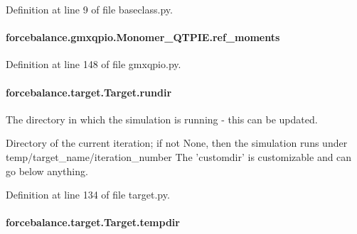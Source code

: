 Definition at line 9 of file baseclass.\-py.

\hypertarget{classforcebalance_1_1gmxqpio_1_1Monomer__QTPIE_a17de0cabe736ba52ae17f8476db7d35a}{
\paragraph[{ref\-\_\-moments}]{\setlength{\rightskip}{0pt plus 5cm}forcebalance.\-gmxqpio.\-Monomer\-\_\-\-Q\-T\-P\-I\-E.\-ref\-\_\-moments}}\label{classforcebalance_1_1gmxqpio_1_1Monomer__QTPIE_a17de0cabe736ba52ae17f8476db7d35a}


Definition at line 148 of file gmxqpio.\-py.

\hypertarget{classforcebalance_1_1target_1_1Target_a6872de5b2d4273b82336ea5b0da29c9e}{
\paragraph[{rundir}]{\setlength{\rightskip}{0pt plus 5cm}forcebalance.\-target.\-Target.\-rundir\hspace{0.3cm}{\ttfamily [inherited]}}}\label{classforcebalance_1_1target_1_1Target_a6872de5b2d4273b82336ea5b0da29c9e}


The directory in which the simulation is running -\/ this can be updated. 

Directory of the current iteration; if not None, then the simulation runs under temp/target\-\_\-name/iteration\-\_\-number The 'customdir' is customizable and can go below anything.

Definition at line 134 of file target.\-py.

\hypertarget{classforcebalance_1_1target_1_1Target_aa1f01b5b78db253b5b66384ed11ed193}{
\paragraph[{tempdir}]{\setlength{\rightskip}{0pt plus 5cm}forcebalance.\-target.\-Target.\-tempdir\hspace{0.3cm}{\ttfamily [inherited]}}}\label{classforcebalance_1_1target_1_1Target_aa1f01b5b78db253b5b66384ed11ed193}


